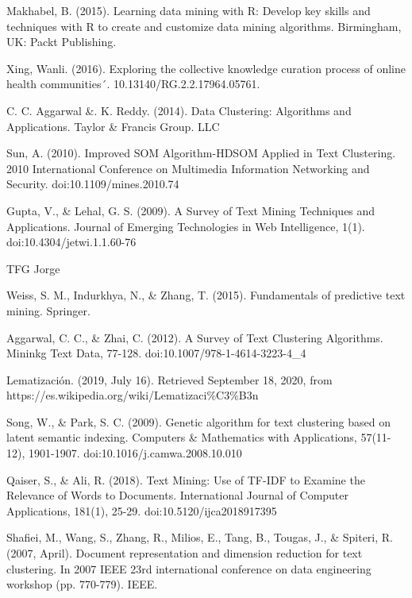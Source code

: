 \documentclass[10pt, a4paper]{article}
\begin{document}
\begin{thebibliography}{X}
 Makhabel, B. (2015). Learning data mining with R: Develop key skills and techniques with R to create and customize data mining algorithms. Birmingham, UK: Packt Publishing.

 Xing, Wanli. (2016). Exploring the collective knowledge curation process of online health communities´. 10.13140/RG.2.2.17964.05761. 

 C. C. Aggarwal \&. K. Reddy. (2014). Data Clustering: Algorithms and Applications. Taylor \& Francis Group. LLC

 Sun, A. (2010). Improved SOM Algorithm-HDSOM Applied in Text Clustering. 2010 International Conference on Multimedia Information Networking and Security. doi:10.1109/mines.2010.74

 Gupta, V., \& Lehal, G. S. (2009). A Survey of Text Mining Techniques and Applications. Journal of Emerging Technologies in Web Intelligence, 1(1). doi:10.4304/jetwi.1.1.60-76

 TFG Jorge

 Weiss, S. M., Indurkhya, N., \& Zhang, T. (2015). Fundamentals of predictive text mining. Springer.

 Aggarwal, C. C., \& Zhai, C. (2012). A Survey of Text Clustering Algorithms. Mininkg Text Data, 77-128. doi:10.1007/978-1-4614-3223-4\_4

 Lematización. (2019, July 16). Retrieved September 18, 2020, from https://es.wikipedia.org/wiki/Lematizaci\%C3\%B3n

 Song, W., \& Park, S. C. (2009). Genetic algorithm for text clustering based on latent semantic indexing. Computers \& Mathematics with Applications, 57(11-12), 1901-1907. doi:10.1016/j.camwa.2008.10.010

 Qaiser, S., \& Ali, R. (2018). Text Mining: Use of TF-IDF to Examine the Relevance of Words to Documents. International Journal of Computer Applications, 181(1), 25-29. doi:10.5120/ijca2018917395

 Shafiei, M., Wang, S., Zhang, R., Milios, E., Tang, B., Tougas, J., \& Spiteri, R. (2007, April). Document representation and dimension reduction for text clustering. In 2007 IEEE 23rd international conference on data engineering workshop (pp. 770-779). IEEE.


\end{thebibliography}
\end{document}
